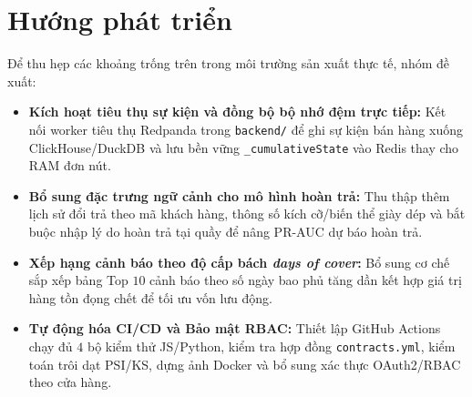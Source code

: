 \section{Hướng phát triển}
Để thu hẹp các khoảng trống trên trong môi trường sản xuất thực tế, nhóm đề xuất:
\begin{itemize}[topsep=0pt, itemsep=1pt]
	\item \textbf{Kích hoạt tiêu thụ sự kiện và đồng bộ bộ nhớ đệm trực tiếp:} Kết nối worker tiêu thụ Redpanda trong \texttt{backend/} để ghi sự kiện bán hàng xuống ClickHouse/DuckDB và lưu bền vững \texttt{_cumulativeState} vào Redis thay cho RAM đơn nút.
	\item \textbf{Bổ sung đặc trưng ngữ cảnh cho mô hình hoàn trả:} Thu thập thêm lịch sử đổi trả theo mã khách hàng, thông số kích cỡ/biến thể giày dép và bắt buộc nhập lý do hoàn trả tại quầy để nâng PR-AUC dự báo hoàn trả.
	\item \textbf{Xếp hạng cảnh báo theo độ cấp bách \textit{days of cover}:} Bổ sung cơ chế sắp xếp bảng Top $10$ cảnh báo theo số ngày bao phủ tăng dần kết hợp giá trị hàng tồn đọng chết để tối ưu vốn lưu động.
	\item \textbf{Tự động hóa CI/CD và Bảo mật RBAC:} Thiết lập GitHub Actions chạy đủ $4$ bộ kiểm thử JS/Python, kiểm tra hợp đồng \texttt{contracts.yml}, kiểm toán trôi dạt PSI/KS, dựng ảnh Docker và bổ sung xác thực OAuth2/RBAC theo cửa hàng.
\end{itemize}
